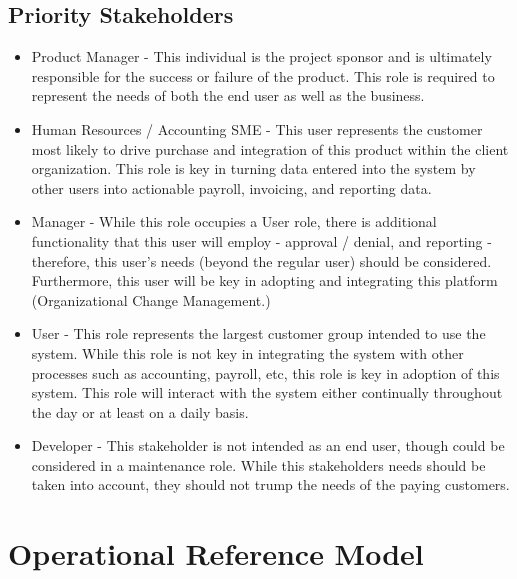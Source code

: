 \documentclass[12pt]{article}
\begin{document}
\subsection{Priority Stakeholders}
\begin{itemize}

\item Product Manager - This individual is the project sponsor and is ultimately responsible for the success or failure of the product.  This role is required to represent the needs of both the end user as well as the business.\\

\item Human Resources / Accounting SME - This user represents the customer most likely to drive purchase and integration of this product within the client organization.  This role is key in turning data entered into the system by other users into actionable payroll, invoicing, and reporting data.\\

\item Manager - While this role occupies a User role, there is additional functionality that this user will employ - approval / denial, and reporting -  therefore, this user’s needs (beyond the regular user) should be considered. Furthermore, this user will be key in adopting and integrating this platform (Organizational Change Management.)\\

\item User - This role represents the largest customer group intended to use the system.  While this role is not key in integrating the system with other processes such as accounting, payroll, etc, this role is key in adoption of this system.  This role will interact with the system either continually throughout the day or at least on a daily basis.\\

\item Developer - This stakeholder is not intended as an end user, though could be considered in a maintenance role.  While this stakeholders needs should be taken into account, they should not trump the needs of the paying customers.
\end{itemize}


\section{Operational Reference Model}
\end{document}

